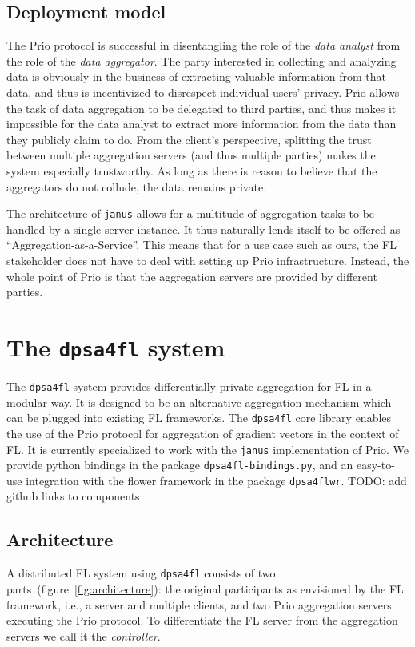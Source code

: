 \documentclass{article}
\begin{document}
\subsection{Deployment model}
The Prio protocol is successful in disentangling the role of the \textit{data
  analyst} from the role of the \textit{data aggregator}. The party interested
in collecting and analyzing data is obviously in the business of extracting valuable
information from that data, and thus is incentivized to disrespect individual
users' privacy. Prio allows the task of data aggregation to be delegated to
third parties, and thus makes it impossible for the data analyst to extract more
information from the data than they publicly claim to do. From the client's
perspective, splitting the trust between multiple aggregation servers (and thus
multiple parties) makes the system especially trustworthy. As long as there is
reason to believe that the aggregators do not collude, the data
remains private.

The architecture of \texttt{janus} allows for a multitude of aggregation tasks
to be handled by a single server instance. It thus naturally lends itself to be
offered as ``Aggregation-as-a-Service''. This means that for a use case such as
ours, the FL stakeholder does not have to deal with setting up Prio
infrastructure. Instead, the whole point of Prio is that the aggregation servers
are provided by different parties.

\section{The \texttt{dpsa4fl} system}
The \texttt{dpsa4fl} system provides differentially private aggregation for FL in a
modular way. It is designed to be an alternative aggregation mechanism which can
be plugged into existing FL frameworks. The \texttt{dpsa4fl} core library
enables the use of the Prio protocol for aggregation of gradient vectors in the
context of FL. It is currently specialized to work with the \texttt{janus}
implementation of Prio. We provide python bindings in the package
\texttt{dpsa4fl-bindings.py}, and an easy-to-use integration with the flower
framework in the package \texttt{dpsa4flwr}.
{\color{green}TODO: add github links to components}

\subsection{Architecture}
A distributed FL system using \texttt{dpsa4fl} consists of
two parts~(figure~\ref{fig:architecture}): the original participants as envisioned by the FL
framework, i.e., a server and multiple clients, and two Prio aggregation servers
executing the Prio protocol. To differentiate the FL server from the aggregation
servers we call it the \textit{controller}.
\end{document}
